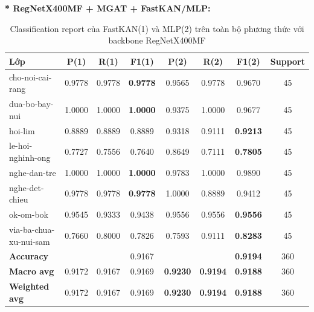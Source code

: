 \newpage
\textbf{* RegNetX400MF + MGAT + FastKAN/MLP:}
\begin{table}[H]
\centering
\renewcommand{\arraystretch}{1.08}
\caption{\centering Classification report của FastKAN(1) và MLP(2) trên toàn bộ phương thức với backbone RegNetX400MF}
\begin{tabular}{lccccccc}
\hline
\textbf{Lớp} &
\textbf{P(1)} & \textbf{R(1)} & \textbf{F1(1)} &
\textbf{P(2)} & \textbf{R(2)} & \textbf{F1(2)} &
\textbf{Support} \\
\hline

cho-noi-cai-rang
& 0.9778 & 0.9778 & \textbf{0.9778}
& 0.9565 & 0.9778 & 0.9670 & 45 \\

dua-bo-bay-nui
& 1.0000 & 1.0000 & \textbf{1.0000}
& 0.9375 & 1.0000 & 0.9677 & 45 \\

hoi-lim
& 0.8889 & 0.8889 & 0.8889
& 0.9318 & 0.9111 & \textbf{0.9213} & 45 \\

le-hoi-nghinh-ong
& 0.7727 & 0.7556 & 0.7640
& 0.8649 & 0.7111 & \textbf{0.7805} & 45 \\

nghe-dan-tre
& 1.0000 & 1.0000 & \textbf{1.0000}
& 0.9783 & 1.0000 & 0.9890 & 45 \\

nghe-det-chieu
& 0.9778 & 0.9778 & \textbf{0.9778}
& 1.0000 & 0.8889 & 0.9412 & 45 \\

ok-om-bok
& 0.9545 & 0.9333 & 0.9438
& 0.9556 & 0.9556 & \textbf{0.9556} & 45 \\

via-ba-chua-xu-nui-sam
& 0.7660 & 0.8000 & 0.7826
& 0.7593 & 0.9111 & \textbf{0.8283} & 45 \\
\hline

\textbf{Accuracy}
& & & 0.9167
& & & \textbf{0.9194} & 360 \\

\textbf{Macro avg}
& 0.9172 & 0.9167 & 0.9169
& \textbf{0.9230} & \textbf{0.9194} & \textbf{0.9188} & 360 \\

\textbf{Weighted avg}
& 0.9172 & 0.9167 & 0.9169
& \textbf{0.9230} & \textbf{0.9194} & \textbf{0.9188} & 360 \\
\hline
\end{tabular}
\end{table}
